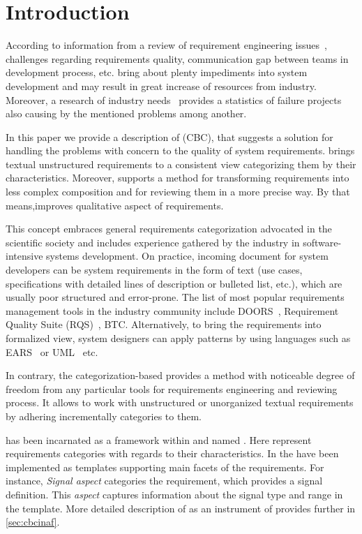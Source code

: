 \section{Introduction}
\label{sec:intro} 

According to information from a review of requirement engineering issues~\cite{1Review}, challenges regarding requirements quality, communication gap between teams in development process, etc. bring about plenty impediments into system development and may result in great increase of resources from industry. Moreover, a research of industry needs~\cite{16NaPiRe} provides a statistics of failure projects also causing by the mentioned problems among another.

In this paper we provide a description of \cbc (CBC), that suggests a solution for handling the problems with concern to the quality of system requirements. \cc brings textual unstructured requirements to a consistent view categorizing them by their characteristics. Moreover, \cc supports a method for transforming requirements into less complex composition and for reviewing them in a more precise way. By that means,\cbc improves qualitative aspect of requirements.

This concept embraces general requirements categorization advocated in the scientific society and includes experience gathered by the industry in software-intensive systems development. On practice, incoming document for system developers can be system requirements in the form of text (use cases, specifications with detailed lines of description or bulleted list, etc.), which are usually poor structured and error-prone. The list of most popular requirements management tools in the industry community include DOORS~\cite{DOORS}, Requirement Quality Suite (RQS)~\cite{12RQS}, BTC. Alternatively, to bring the requirements into formalized view, system designers can apply patterns by using languages such as EARS~\cite{13EARS} or UML~\cite{14UML} etc. %

In contrary, the \cbc categorization-based provides a method with noticeable degree of freedom from any particular tools for requirements engineering and reviewing process. It allows to work with unstructured or unorganized textual requirements by adhering incrementally categories to them. 

\cbc has been incarnated as a framework within \autof and named \asp. Here \asp represent requirements categories with regards to their characteristics. In \af  the \asp have been implemented as templates supporting main facets of the requirements. For instance, \textit{Signal aspect} categories the requirement, which provides a signal definition. This \textit{aspect} captures information about the signal type and range in the template. More detailed description of \asp as an instrument of \cc provides further in \autoref{sec:cbcinaf}. 


